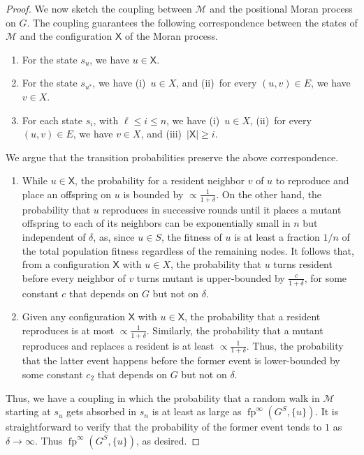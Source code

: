 \documentclass[letterpaper]{article}
\newcommand{\X}{\mathsf{X}}
\newcommand{\fp}{\operatorname{fp}}
\newcommand{\FitAdv}{\delta}
\newcommand{\MC}{\mathcal{M}}
\begin{document}
\begin{proof}
We now sketch the coupling between $\MC$ and the positional Moran process on $G$.
The coupling guarantees the following correspondence between the states of $\MC$ and the configuration $\X$ of the Moran process.
\begin{enumerate}
\item For the state $s_u$, we have $u\in \X$.
\item For the state $s_{u^*}$, we have (i)~$u\in X$, and (ii)~for every $(u,v)\in E$, we have $v\in X$.
\item For each state $s_i$, with $\ell \leq i \leq n$, we have (i)~$u\in X$, (ii)~for every $(u,v)\in E$, we have $v\in X$, and (iii)~$|\X|\geq i$.
\end{enumerate}
We argue that the transition probabilities preserve the above correspondence.
\begin{enumerate}
\item While $u\in \X$, the probability for a resident neighbor $v$ of $u$ to reproduce and place an offspring on $u$ is bounded by $\propto \frac{1}{1+\FitAdv}$.
On the other hand, the probability that $u$ reproduces in successive rounds until it places a mutant offspring to each of its neighbors can be exponentially small in $n$ but independent of $\FitAdv$, as, since $u\in S$, the fitness of $u$ is at least a fraction $1/n$ of the total population fitness regardless of the remaining nodes.
It follows that, from a configuration $\X$ with $u\in X$, the probability that $u$ turns resident before every neighbor of $v$ turns mutant is upper-bounded by $\frac{c}{1+\FitAdv}$, for some constant $c$ that depends on $G$ but not on $\FitAdv$.
\item Given any configuration $\X$ with $u\in \X$, the probability that a resident reproduces is at most $\propto \frac{1}{1+\FitAdv}$.
Similarly, the probability that a mutant reproduces and replaces a resident is at least $\propto \frac{1}{1+\FitAdv}$.
Thus, the probability that the latter event happens before the former event is lower-bounded by some constant $c_2$ that depends on $G$ but not on $\FitAdv$.
\end{enumerate}
Thus, we have a coupling in which the probability that a random walk in $\MC$ starting at $s_u$ gets absorbed in $s_n$ is at least as large as $\fp^{\infty}(G^S, \{u\})$.
It is straightforward to verify that the probability of the former event tends to $1$ as $\FitAdv\to \infty$.
Thus $\fp^{\infty}(G^S, \{u\})$, as desired.
\end{proof}
\end{document}
